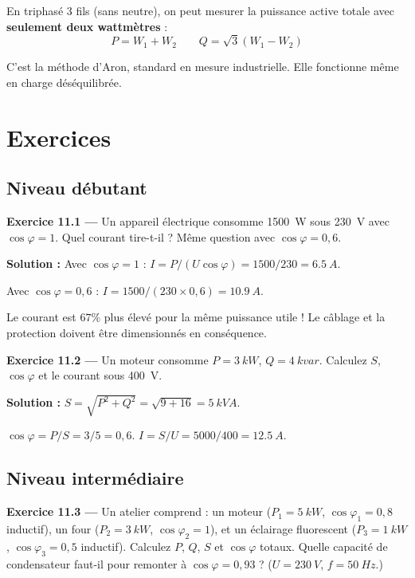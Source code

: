 \documentclass[12pt,a4paper,twoside]{book}
\begin{document}
En triphasé 3 fils (sans neutre), on peut mesurer la puissance active totale avec \textbf{seulement deux wattmètres} :
\[
P = W_1 + W_2 \qquad Q = \sqrt{3}(W_1 - W_2)
\]

C'est la méthode d'Aron, standard en mesure industrielle. Elle fonctionne même en charge déséquilibrée.

\section*{Exercices}

\subsection*{Niveau débutant}

\textbf{Exercice 11.1 ---} Un appareil électrique consomme \SI{1500}{W} sous \SI{230}{V} avec $\cos\varphi = 1$. Quel courant tire-t-il ? Même question avec $\cos\varphi = 0{,}6$.

\begin{pratique}
\textbf{Solution :} Avec $\cos\varphi = 1$ : $I = P/(U\cos\varphi) = 1500/230 = \SI{6.5}{A}$.

Avec $\cos\varphi = 0{,}6$ : $I = 1500/(230\times0{,}6) = \SI{10.9}{A}$.

Le courant est $67\%$ plus élevé pour la même puissance utile ! Le câblage et la protection doivent être dimensionnés en conséquence.
\end{pratique}

\textbf{Exercice 11.2 ---} Un moteur consomme $P = \SI{3}{kW}$, $Q = \SI{4}{kvar}$. Calculez $S$, $\cos\varphi$ et le courant sous \SI{400}{V}.

\begin{pratique}
\textbf{Solution :} $S = \sqrt{P^2+Q^2} = \sqrt{9+16} = \SI{5}{kVA}$.

$\cos\varphi = P/S = 3/5 = 0{,}6$. $I = S/U = 5000/400 = \SI{12.5}{A}$.
\end{pratique}

\subsection*{Niveau intermédiaire}

\textbf{Exercice 11.3 ---} Un atelier comprend : un moteur ($P_1 = \SI{5}{kW}$, $\cos\varphi_1 = 0{,}8$ inductif), un four ($P_2 = \SI{3}{kW}$, $\cos\varphi_2 = 1$), et un éclairage fluorescent ($P_3 = \SI{1}{kW}$, $\cos\varphi_3 = 0{,}5$ inductif). Calculez $P$, $Q$, $S$ et $\cos\varphi$ totaux. Quelle capacité de condensateur faut-il pour remonter à $\cos\varphi = 0{,}93$ ? ($U = \SI{230}{V}$, $f = \SI{50}{Hz}$.)
\end{document}
